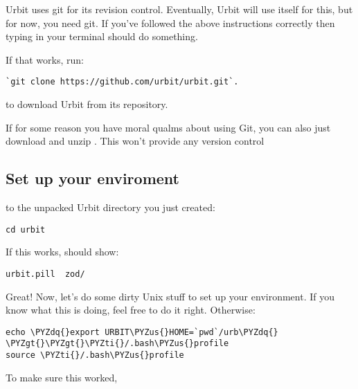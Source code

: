 Urbit uses git for its revision control. Eventually, Urbit will use itself for this, but for now,
you need git. If you've followed the above instructions correctly then typing  in your terminal should do something. 

If that works, run:

\begin{framed_shaded}
\begin{Verbatim}[fontsize=\relsize{-2.5},fontseries=b,commandchars=\\\{\}]
`git clone https://github.com/urbit/urbit.git`.
\end{Verbatim}
\end{framed_shaded}
to download Urbit from its repository. 

If for some reason you have moral qualms about using Git, you can also just download and unzip . This won't provide any version control

\subsection{Set up your enviroment}

 to the unpacked Urbit directory you just created:

\begin{framed_shaded}
\begin{Verbatim}[fontsize=\relsize{-2.5},fontseries=b,commandchars=\\\{\}]
cd urbit
\end{Verbatim}
\end{framed_shaded}
If this works,  should show:

\begin{framed_shaded}
\begin{Verbatim}[fontsize=\relsize{-2.5},fontseries=b,commandchars=\\\{\}]
urbit.pill  zod/
\end{Verbatim}
\end{framed_shaded}
Great!  Now, let's do some dirty Unix stuff to set up your environment.
If you know what this is doing, feel free to do it right.  Otherwise:

\begin{framed_shaded}
\begin{Verbatim}[fontsize=\relsize{-2.5},fontseries=b,commandchars=\\\{\}]
echo \PYZdq{}export URBIT\PYZus{}HOME=`pwd`/urb\PYZdq{} \PYZgt{}\PYZgt{}\PYZti{}/.bash\PYZus{}profile
source \PYZti{}/.bash\PYZus{}profile
\end{Verbatim}
\end{framed_shaded}
To make sure this worked,

